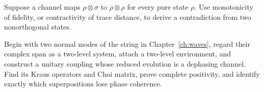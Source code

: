 \begin{exercise}
Suppose a channel maps $\rho\otimes\sigma$ to $\rho\otimes\rho$ for every
pure state $\rho$.  Use monotonicity of fidelity, or contractivity of trace
distance, to derive a contradiction from two nonorthogonal states.
\end{exercise}

\begin{exercise}
Begin with two normal modes of the string in Chapter~\ref{ch:waves}, regard
their complex span as a two-level system, attach a two-level environment, and
construct a unitary coupling whose reduced evolution is a dephasing channel.
Find its Kraus operators and Choi matrix, prove complete positivity, and
identify exactly which superpositions lose phase coherence.
\end{exercise}

